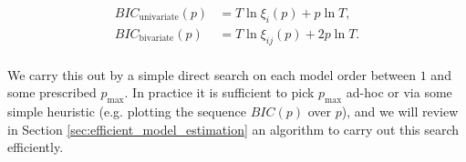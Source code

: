 \documentclass[12pt]{article}
\begin{document}
\begin{equation}
  \label{eqn:bic}
  \begin{aligned}
    BIC_{\text{univariate}}(p) &= T \ln \xi_i(p) + p\ln T,\\
    BIC_{\text{bivariate}}(p) &= T \ln \xi_{ij}(p) + 2p\ln T.\\
  \end{aligned}
\end{equation}

We carry this out by a simple direct search on each model order
between $1$ and some prescribed $p_\text{max}$.  In practice it is
sufficient to pick $p_\text{max}$ ad-hoc or via some simple heuristic
(e.g. plotting the sequence $BIC(p)$ over $p$), and we will review in
Section \ref{sec:efficient_model_estimation} an algorithm to carry out
this search efficiently.





\end{document}
